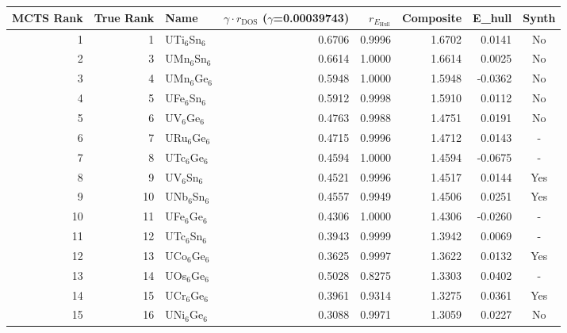 \begin{tabular}{rrlrrrrc}
\toprule
MCTS Rank & True Rank & Name & $\gamma \cdot r_{\mathrm{DOS}}$ ($\gamma$=0.00039743) & $r_{E_{\mathrm{Hull}}}$ & Composite & E\_hull & Synth \\
\midrule
1 & 1 & UTi$_{6}$Sn$_{6}$ & 0.6706 & 0.9996 & 1.6702 & 0.0141 & No \\
2 & 3 & UMn$_{6}$Sn$_{6}$ & 0.6614 & 1.0000 & 1.6614 & 0.0025 & No \\
3 & 4 & UMn$_{6}$Ge$_{6}$ & 0.5948 & 1.0000 & 1.5948 & -0.0362 & No \\
4 & 5 & UFe$_{6}$Sn$_{6}$ & 0.5912 & 0.9998 & 1.5910 & 0.0112 & No \\
5 & 6 & UV$_{6}$Ge$_{6}$ & 0.4763 & 0.9988 & 1.4751 & 0.0191 & No \\
6 & 7 & URu$_{6}$Ge$_{6}$ & 0.4715 & 0.9996 & 1.4712 & 0.0143 & - \\
7 & 8 & UTc$_{6}$Ge$_{6}$ & 0.4594 & 1.0000 & 1.4594 & -0.0675 & - \\
8 & 9 & UV$_{6}$Sn$_{6}$ & 0.4521 & 0.9996 & 1.4517 & 0.0144 & Yes \\
9 & 10 & UNb$_{6}$Sn$_{6}$ & 0.4557 & 0.9949 & 1.4506 & 0.0251 & Yes \\
10 & 11 & UFe$_{6}$Ge$_{6}$ & 0.4306 & 1.0000 & 1.4306 & -0.0260 & - \\
11 & 12 & UTc$_{6}$Sn$_{6}$ & 0.3943 & 0.9999 & 1.3942 & 0.0069 & - \\
12 & 13 & UCo$_{6}$Ge$_{6}$ & 0.3625 & 0.9997 & 1.3622 & 0.0132 & Yes \\
13 & 14 & UOs$_{6}$Ge$_{6}$ & 0.5028 & 0.8275 & 1.3303 & 0.0402 & - \\
14 & 15 & UCr$_{6}$Ge$_{6}$ & 0.3961 & 0.9314 & 1.3275 & 0.0361 & Yes \\
15 & 16 & UNi$_{6}$Ge$_{6}$ & 0.3088 & 0.9971 & 1.3059 & 0.0227 & No \\
\bottomrule
\end{tabular}
